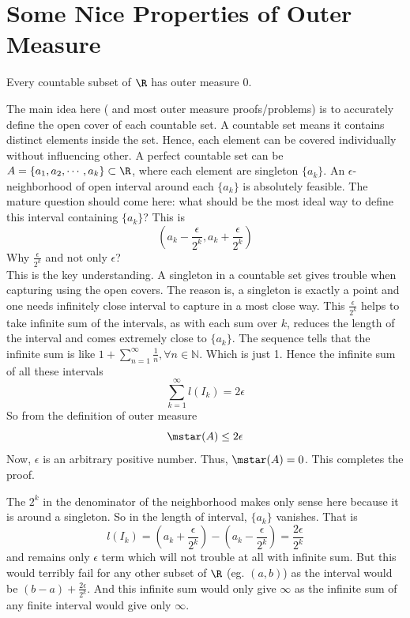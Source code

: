 \section{Some Nice Properties of Outer Measure}

\begin{theorem}
    Every countable subset of $\R$ has outer measure 0.
\end{theorem}
\begin{proofsketch}
    The main idea here ( and most outer measure proofs/problems) is to accurately define the open cover of each countable set. A countable set means it contains distinct elements inside the set. Hence, each element can be covered individually without influencing other. A perfect countable set can be $ A = \{a_1, a_2, \cdots , a_k\} \subset \R$, where each element are singleton $\{a_k\}$. An $\epsilon$-neighborhood of open interval around each $\{a_k\}$ is absolutely feasible. The mature question should come here: what should be the most ideal way to define this interval containing $\{a_k\}$? This is
    \[
    (a_k - \frac{\epsilon}{2^k}, a_k+\frac{\epsilon}{2^k})
    \]
    Why $\frac{\epsilon}{2^k}$ and not only $\epsilon$?\\
    This is the key understanding. A singleton in a countable set gives trouble when capturing using the open covers. The reason is, a singleton is exactly a point and one needs infinitely close interval to capture in a most close way. This $\frac{\epsilon}{2^k}$ helps to take infinite sum of the intervals, as with each sum over $k$, reduces the length of the interval and comes extremely close to $\{a_k\}$. The sequence tells that the infinite sum is like $1+\sum_{n=1}^\infty \frac{1}{n}, \forall n\in \mathbb{N}$. Which is just 1. Hence the infinite sum of all these intervals
    \[
    \sum_{k=1}^\infty l(I_k) = 2\epsilon
    \]
    So from the definition of outer measure
    \[
    \mstar(A) \leq 2\epsilon
    \]
    Now, $\epsilon$ is an arbitrary positive number. Thus, $\mstar(A) = 0$. This completes the proof. 
\end{proofsketch}
\begin{remark}
    The $2^k$ in the denominator of the neighborhood makes only sense here because it is around a singleton. So in the length of interval, $\{a_k\}$ vanishes. That is
    \[
    l(I_k)=(a_k+\frac{\epsilon}{2^k})-(a_k-\frac{\epsilon}{2^k})=\frac{2\epsilon}{2^k}
    \]
    and remains only $\epsilon$ term which will not trouble at all with infinite sum. But this would terribly fail for any other subset of $\R$ (eg. $(a, b)$) as the interval would be $(b-a)+\frac{2\epsilon}{2^k}$. And this infinite sum would only give $\infty$ as the infinite sum of any finite interval would give only $\infty$. 
\end{remark}
